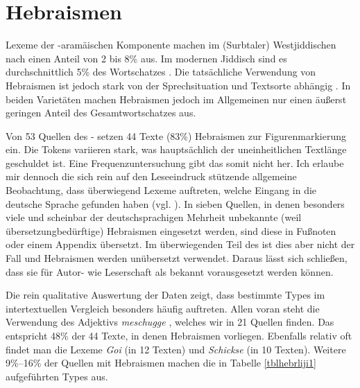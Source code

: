      \section{Hebraismen}\label{hebrliji1}
Lexeme der -aramäischen Komponente machen im (Surbtaler) Westjiddischen nach \citealt[45–49]
{GuggenheimGruenberg1976} einen Anteil von 2 bis 8\% aus. Im modernen Jiddisch sind es durchschnittlich 5\% des Wortschatzes \parencite[5f]{Timm2005}. Die tatsächliche Verwendung von Hebraismen ist jedoch stark von der Sprechsituation und Textsorte abhängig \parencite{Mark1954}. In beiden Varietäten machen Hebraismen jedoch im Allgemeinen nur einen äußerst geringen Anteil des Gesamtwortschatzes aus. 
 
Von 53 Quellen des - setzen 44 Texte (83\%) Hebraismen zur Figurenmarkierung ein. Die Tokens variieren stark, was hauptsächlich der uneinheitlichen Textlänge geschuldet ist. Eine Frequenzuntersuchung gibt das  somit nicht her. Ich erlaube mir dennoch die sich rein auf den Leseeindruck stützende allgemeine Beobachtung, dass überwiegend Lexeme auftreten, welche Eingang in die deutsche Sprache gefunden haben (vgl. \citealt{Althaus2002,Althaus2004}). In sieben Quellen, in denen besonders viele und scheinbar der deutschsprachigen Mehrheit unbekannte (weil übersetzungbedürftige) Hebraismen eingesetzt werden, sind diese in Fußnoten oder einem Appendix übersetzt. Im überwiegenden Teil des  ist dies aber nicht der Fall und Hebraismen werden unübersetzt verwendet. Daraus lässt sich schließen, dass sie für Autor- wie Leserschaft als bekannt vorausgesetzt werden können.‏

  
Die rein qualitative Auswertung der Daten zeigt, dass bestimmte Types im intertextuellen Vergleich besonders häufig auftreten. Allen voran steht die Verwendung des Adjektivs \textit{meschugge} , welches wir in 21 Quellen finden. Das entspricht 48\% der 44 Texte, in denen Hebraismen vorliegen. Ebenfalls relativ oft findet man die Lexeme \textit{Goi}  (in 12 Texten) und \textit{Schickse}  (in 10 Texten). Weitere 9\%–16\% der Quellen mit Hebraismen machen die in Tabelle \ref{tblhebrliji1} aufgeführten Types aus. 

